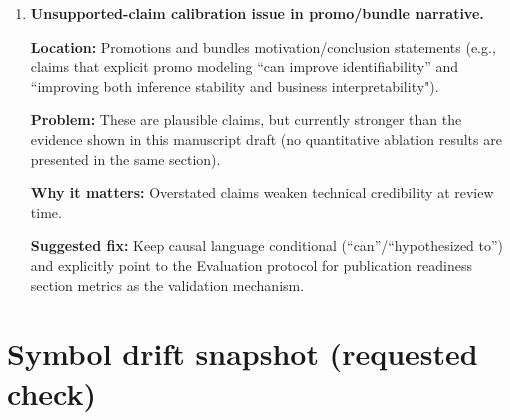 \documentclass[11pt]{article}
\begin{document}
\begin{enumerate}
  \textbf{Location:} Global indices/definitions and recipe subsection.

  \textbf{Problem:} $B$ denotes number of bundle types, $B_{k,i}$ denotes in-transit inventory state, and $B^{(m)}_{k,j,i}$ denotes per-instance Bernoulli usage indicator.

  \textbf{Why it matters:} Overloaded symbols increase risk of coding errors and documentation drift, especially in appendices or software implementations.

  \textbf{Suggested fix:} Rename at least one family, e.g. bundle count $N_{\mathrm{bundle}}$, indicator $Z^{(m)}_{k,j,i}$, while keeping $B_{k,i}$ for pipeline stock.

  \item \textbf{Unsupported-claim calibration issue in promo/bundle narrative.}

  \textbf{Location:} Promotions and bundles motivation/conclusion statements (e.g., claims that explicit promo modeling ``can improve identifiability'' and ``improving both inference stability and business interpretability").

  \textbf{Problem:} These are plausible claims, but currently stronger than the evidence shown in this manuscript draft (no quantitative ablation results are presented in the same section).

  \textbf{Why it matters:} Overstated claims weaken technical credibility at review time.

  \textbf{Suggested fix:} Keep causal language conditional (``can''/``hypothesized to'') and explicitly point to the Evaluation protocol for publication readiness section metrics as the validation mechanism.
\end{enumerate}

\section*{Symbol drift snapshot (requested check)}
\end{document}
